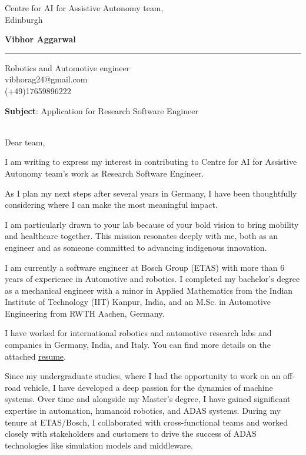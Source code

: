 \documentclass[a4paper,10 pt]{letter} %
\date{\today} %
\begin{document}
\renewcommand{\enclname}{Enclosed}
\longindentation=0pt                       %
\let\raggedleft\raggedright                %
 
 
\begin{letter}
{Centre for AI for Assistive Autonomy team, \\
Edinburgh
}
\begin{center}
{\large\bf Vibhor Aggarwal} 
\end{center}
\medskip\hrule height 1pt
\begin{center}
{Robotics and Automotive engineer  \\  vibhorag24@gmail.com\\ (+49)17659896222} 
\end{center} \vfill %

\textbf{Subject}: Application for Research Software Engineer \\ \\
\opening{Dear team,} 

I am writing to express my interest in contributing to Centre for AI for Assistive Autonomy team's work as Research Software Engineer.

As I plan my next steps after several years in Germany, I have been thoughtfully considering where I can make the most meaningful impact.

I am particularly drawn to your lab because of your bold vision to bring mobility and healthcare together. This mission resonates deeply with me, both as an engineer and as someone committed to advancing indigenous innovation.

I am currently a software engineer at Bosch Group (ETAS) with more than 6 years of experience in Automotive and robotics. I completed my bachelor’s degree as a mechanical engineer with a minor in Applied Mathematics from the Indian Institute of Technology (IIT) Kanpur, India, and an M.Sc. in Automotive Engineering from RWTH Aachen, Germany.

I have worked for international robotics and automotive research labs and companies in Germany, India, and Italy. You can find more details on the attached \href{https://vibhoraggarwal.github.io/files/VibhorResume_en.pdf}{resume}. 

Since my undergraduate studies, where I had the opportunity to work on an off-road vehicle, I have developed a deep passion for the dynamics of machine systems. Over time and alongside my Master's degree, I have gained significant expertise in automation, humanoid robotics, and ADAS systems. During my tenure at ETAS/Bosch, I collaborated with cross-functional teams and worked closely with stakeholders and customers to drive the success of ADAS technologies like simulation models and middleware.


\end{letter}
\end{document}

